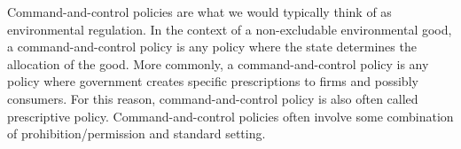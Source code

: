 

Command-and-control policies are what we would typically think of as environmental regulation. In the context of a non-excludable environmental good, a command-and-control policy is any policy where the state determines the allocation of the good. More commonly, a command-and-control policy is any policy where government creates specific prescriptions to firms and possibly consumers. For this reason, command-and-control policy is also often called prescriptive policy. Command-and-control policies often involve some combination of prohibition/permission and standard setting. 


